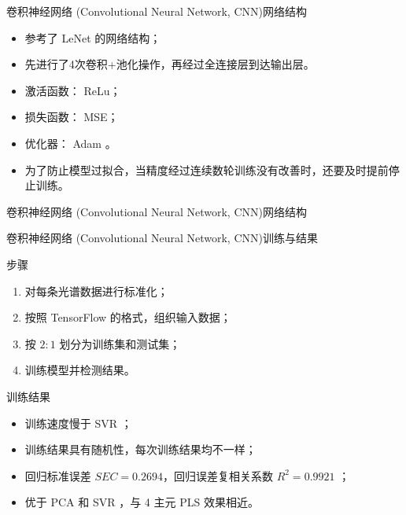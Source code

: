 \documentclass[11pt]{beamer}
\begin{document}
	\begin{frame}{卷积神经网络 (Convolutional Neural Network, CNN)}{网络结构}
		\begin{itemize}
			\item 参考了 LeNet 的网络结构；
			\item 先进行了4次卷积+池化操作，再经过全连接层到达输出层。
			\item 激活函数： ReLu；
			\item 损失函数： MSE；
			\item 优化器： Adam 。
			\item 为了防止模型过拟合，当精度经过连续数轮训练没有改善时，还要及时提前停止训练。
		\end{itemize}
	\end{frame}
	\begin{frame}{卷积神经网络 (Convolutional Neural Network, CNN)}{网络结构}
		\centering
		\scalebox{0.7}{}
	\end{frame}
	\begin{frame}{卷积神经网络 (Convolutional Neural Network, CNN)}{训练与结果}
		\begin{block}{步骤}
			\begin{enumerate}
				\item 对每条光谱数据进行标准化；
				\item 按照 TensorFlow 的格式，组织输入数据；
				\item 按 $2:1$ 划分为训练集和测试集；
				\item 训练模型并检测结果。
			\end{enumerate}
		\end{block}
		\begin{block}{训练结果}
			\begin{itemize}
				\item 训练速度慢于 SVR ；
				\item 训练结果具有随机性，每次训练结果均不一样；
				\item 回归标准误差 $SEC = 0.2694$，回归误差复相关系数 $R^2 = 0.9921$ ；
				\item 优于 PCA 和 SVR ，与 4 主元 PLS 效果相近。
			\end{itemize}
		\end{block}
	\end{frame}
\end{document}
